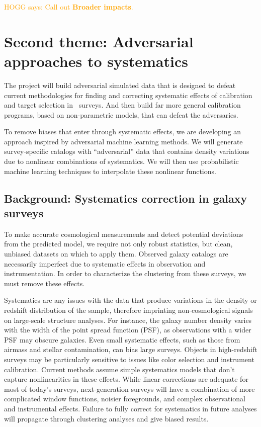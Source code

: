 \documentclass[12pt, fullpage, letterpaper]{article}
\newcommand{\HOGG}[1]{\textcolor{orange}{HOGG says: #1}}
\begin{document}
\HOGG{Call out \textbf{Broader impacts}.}

\section{Second theme: Adversarial approaches to systematics}

The project will build adversarial simulated data that is
designed to defeat current methodologies for finding and correcting
systematic effects of calibration and target selection in \LSS\ 
surveys. And then build far more general calibration
programs, based on non-parametric models, that can defeat the
adversaries.

To remove biases that enter through systematic effects, we are developing an approach inspired by adversarial machine learning methods. 
We will generate survey-specific catalogs with ``adversarial'' data that contains density variations due to nonlinear combinations of systematics.
We will then use probabilistic machine learning techniques to interpolate these nonlinear functions.

\subsection{Background: Systematics correction in galaxy surveys}

To make accurate cosmological measurements and detect potential deviations from the predicted model, we require not only robust statistics, but clean, unbiased datasets on which to apply them.
Observed galaxy catalogs are necessarily imperfect due to systematic effects in observation and instrumentation. 
In order to characterize the clustering from these surveys, we must remove these effects.

Systematics are any issues with the data that produce variations in the density or redshift distribution of the sample, therefore imprinting non-cosmological signals on large-scale structure analyses.
For instance, the galaxy number density varies with the width of the point spread function (PSF), as observations with a wider PSF may obscure galaxies.
Even small systematic effects, such as those from airmass and stellar contamination, can bias large surveys. 
Objects in high-redshift surveys may be particularly sensitive to issues like color selection and instrument calibration.
Current methods assume simple systematics models that don't capture nonlinearities in these effects.
While linear corrections are adequate for most of today's surveys, next-generation surveys will have a combination of more complicated window functions, noisier foregrounds, and complex observational and instrumental effects.
Failure to fully correct for systematics in future analyses will propagate through clustering analyses and give biased results.
\end{document}
